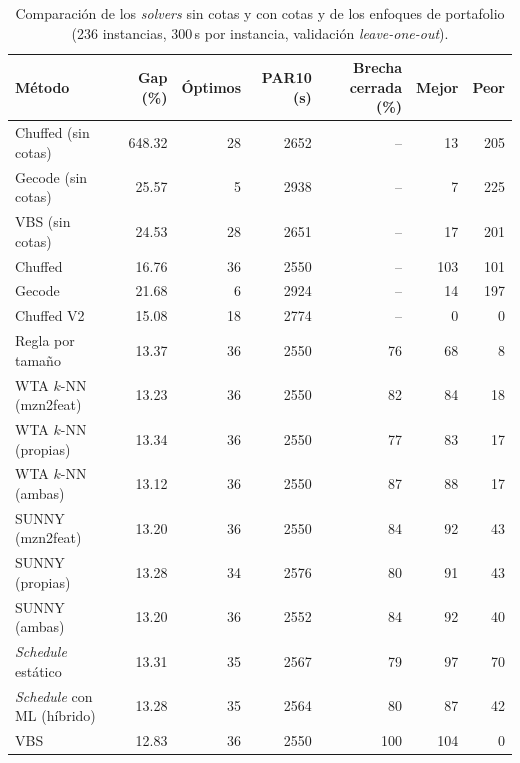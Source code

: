 \begin{table}[H]
  \centering
  \small
  \singlespacing
  \caption{Comparación de los \textit{solvers} sin cotas y con cotas y de los enfoques de portafolio (236 instancias, 300\,s por instancia, validación \textit{leave-one-out}).}
  \label{tab:portafolios}
  \begin{tabular}{lrrrrrr}
    \toprule
    Método & Gap (\%) & Óptimos & PAR10 (s) & Brecha cerrada (\%) & Mejor & Peor \\
    \midrule
    Chuffed (sin cotas) & 648.32 & 28 & 2652 & -- & 13 & 205 \\
    Gecode (sin cotas) & 25.57 & 5 & 2938 & -- & 7 & 225 \\
    VBS (sin cotas) & 24.53 & 28 & 2651 & -- & 17 & 201 \\
    \midrule
    Chuffed & 16.76 & 36 & 2550 & -- & 103 & 101 \\
    Gecode & 21.68 & 6 & 2924 & -- & 14 & 197 \\
    Chuffed V2 & 15.08 & 18 & 2774 & -- & 0 & 0 \\
    \midrule
    Regla por tamaño & 13.37 & 36 & 2550 & 76 & 68 & 8 \\
    WTA $k$-NN (mzn2feat) & 13.23 & 36 & 2550 & 82 & 84 & 18 \\
    WTA $k$-NN (propias) & 13.34 & 36 & 2550 & 77 & 83 & 17 \\
    WTA $k$-NN (ambas) & 13.12 & 36 & 2550 & 87 & 88 & 17 \\
    SUNNY (mzn2feat) & 13.20 & 36 & 2550 & 84 & 92 & 43 \\
    SUNNY (propias) & 13.28 & 34 & 2576 & 80 & 91 & 43 \\
    SUNNY (ambas) & 13.20 & 36 & 2552 & 84 & 92 & 40 \\
    \midrule
    \textit{Schedule} estático & 13.31 & 35 & 2567 & 79 & 97 & 70 \\
    \textit{Schedule} con ML (híbrido) & 13.28 & 35 & 2564 & 80 & 87 & 42 \\
    \midrule
    VBS & 12.83 & 36 & 2550 & 100 & 104 & 0 \\
    \bottomrule
  \end{tabular}
  \par{}
\end{table}

